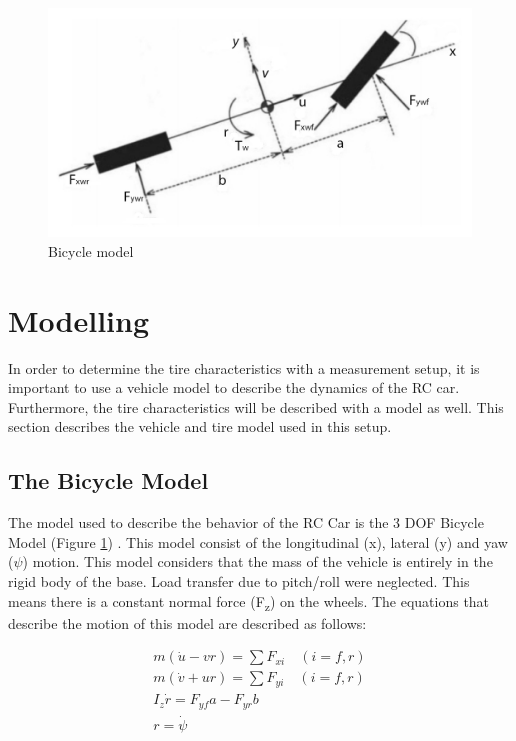 \begin{figure}
	\centering
		\includegraphics[scale=0.34]{figure/bicyclemodel.jpg}
	\caption{Bicycle model}
    \label{fig:bicyclemodel}
\end{figure}

\section{Modelling}
In order to determine the tire characteristics with a measurement setup, it is important to use a vehicle model to describe the dynamics of the RC car. Furthermore, the tire characteristics will be described with a model as well. This section describes the vehicle and tire model used in this setup. 

\subsection{The Bicycle Model}
The model used to describe the behavior of the RC Car is the 3 DOF Bicycle Model (Figure \ref{fig:bicyclemodel}) \cite{Liu}. This model consist of the longitudinal (x), lateral (y) and yaw ($\psi$) motion. This model considers that the mass of the vehicle is entirely in the rigid body of the base. Load transfer due to pitch/roll were neglected. This means there is a constant normal force (F\textsubscript{z})  on the wheels. The equations that describe the motion of this model are described as follows:

\begin{subequations}
\begin{align}
    m(\dot{u}-vr) = \sum F_{xi} \quad   (i= f,r) \\
    m(\dot{v}+ur) = \sum F_{yi} \quad   (i= f,r) \\
	I_{z}\dot{r} = F_{yf}a - F_{yr}b\\
	r = \dot{\psi}
    \label{eq:motion}
    \end{align}
\end{subequations}

